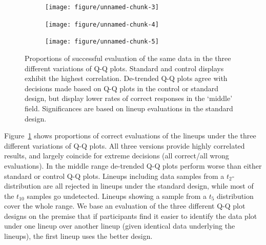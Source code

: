 \documentclass{article}\usepackage[]{graphicx}\usepackage[]{color}
\newenvironment{knitrout}{}{} %
\newcommand{\hh}[1]{{\color{magenta} #1}}
\begin{document}
\begin{figure}
\centering
\begin{subfigure}[b]{.3\textwidth}
\begin{knitrout}
\color{fgcolor}
\texttt{[image: figure/unnamed-chunk-3]} 

\end{knitrout}

\end{subfigure}
\begin{subfigure}[b]{.3\textwidth}
\begin{knitrout}
\color{fgcolor}
\texttt{[image: figure/unnamed-chunk-4]} 

\end{knitrout}

\end{subfigure}
\begin{subfigure}[b]{.3\textwidth}
\begin{knitrout}
\color{fgcolor}
\texttt{[image: figure/unnamed-chunk-5]} 

\end{knitrout}

\end{subfigure}
\caption{\label{fig:compare}Proportions of successful evaluation of the same data in the three different variations of Q-Q plots. Standard and control displays exhibit the highest correlation. De-trended Q-Q plots agree with decisions made based on Q-Q plots in the control or standard design, but display lower rates of correct responses in the `middle' field. Significances are based on lineup evaluations in the standard design. }
\end{figure}



Figure~\ref{fig:compare} shows proportions of correct evaluations of the lineups under the three different variations of Q-Q plots. All three versions provide highly correlated results, and largely coincide for extreme decisions (all correct/all wrong evaluations). In the middle range de-trended Q-Q plots perform  worse than either standard or control Q-Q plots. Lineups including data samples from a $t_2$-distribution  are all rejected in lineups under the standard design, while most of the $t_{10}$ samples go undetected. Lineups showing a sample from a $t_5$ distribution cover the whole range.
\hh{We base an evaluation of the three different Q-Q plot designs on the premise that if participants find it easier to identify the data plot under one lineup over another lineup (given identical data underlying the lineups), the first lineup uses the better design.}
\end{document}
